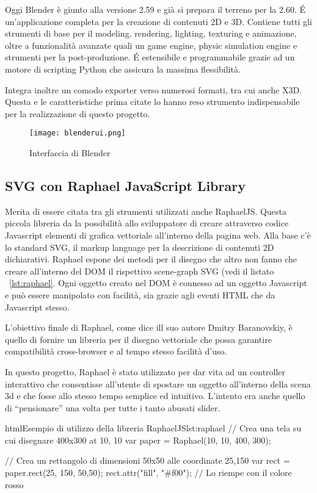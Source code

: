 Oggi Blender è giunto alla versione 2.59 e già si prepara il terreno per la 2.60. \'{E} un'applicazione completa per la creazione di contenuti 2D e 3D. Contiene tutti gli strumenti di base per il modeling, rendering, lighting, texturing e animazione, oltre a funzionalità avanzate quali un game engine, physic simulation engine e strumenti per la post-produzione. \'{E} estensibile e programmabile grazie ad un motore di scripting Python che assicura la massima flessibilità.

Integra inoltre un comodo exporter verso numerosi formati, tra cui anche X3D. Questa e le caratteristiche prima citate lo hanno reso strumento indispensabile per la realizzazione di questo progetto.

\begin{figure}[Ht]
\centering
\texttt{[image: blenderui.png]}
\caption{Interfaccia di Blender}
\label{label:blenderui}
\end{figure}

\subsection{SVG con Raphael JavaScript Library}
Merita di essere citata tra gli strumenti utilizzati anche RaphaelJS. Questa piccola libreria da la possibilità allo sviluppatore di creare attraverso codice Javascript elementi di grafica vettoriale all'interno della pagina web. Alla base c'è lo standard SVG, il markup language per la descrizione di contenuti 2D dichiarativi. Raphael espone dei metodi per il disegno che altro non fanno che creare all'interno del DOM il rispettivo scene-graph SVG (vedi il listato ~\ref{lst:raphael}. Ogni oggetto creato nel DOM è connesso ad un oggetto Javascript e può essere manipolato con facilità, sia grazie agli eventi HTML che da Javascript stesso.

L'obiettivo finale di Raphael, come dice ill suo autore Dmitry Baranovskiy, è quello di fornire un libreria per il disegno vettoriale che possa garantire compatibilità cross-browser e al tempo stesso facilità d'uso.

In questo progetto, Raphael è stato utilizzato per dar vita ad un controller interattivo che consentisse all'utente di spostare un oggetto all'interno della scena 3d e che fosse allo stesso tempo semplice ed intuitivo. L'intento era anche quello di ``pensionare'' una volta per tutte i tanto abusati slider.

\begin{mylisting}{html}{Esempio di utilizzo della libreria RaphaelJS}{lst:raphael}
// Crea una tela su cui disegnare 400x300 at 10, 10
var paper = Raphael(10, 10, 400, 300);

// Crea un rettangolo di dimensioni 50x50 alle coordinate 25,150
var rect = paper.rect(25, 150, 50,50);
rect.attr("fill", "#f00"); // Lo riempe con il colore rosso
\end{mylisting}

